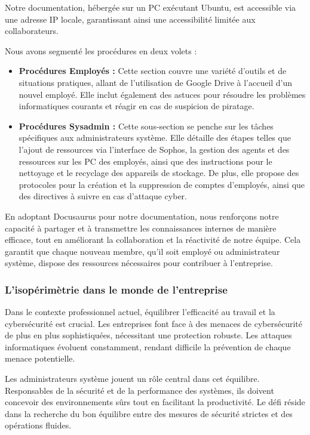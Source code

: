 Notre documentation, hébergée sur un PC  exécutant Ubuntu, est accessible via une adresse IP locale, garantissant ainsi une accessibilité limitée aux collaborateurs.

Nous avons segmenté les procédures en deux volets :
\begin{itemize}
    \item \textbf{Procédures Employés :} Cette section couvre une variété d'outils et de situations pratiques, allant de l'utilisation de Google Drive à l'accueil d'un nouvel employé.
    Elle inclut également des astuces pour résoudre les problèmes informatiques courants et réagir en cas de suspicion de piratage.
    \item \textbf{Procédures Sysadmin :} Cette sous-section se penche sur les tâches spécifiques aux administrateurs système.
    Elle détaille des étapes telles que l'ajout de ressources via l'interface de Sophos, la gestion des agents et des ressources sur les PC des employés, ainsi que des instructions pour le nettoyage et le recyclage des appareils de stockage.
    De plus, elle propose des protocoles pour la création et la suppression de comptes d'employés, ainsi que des directives à suivre en cas d'attaque cyber.
\end{itemize}

En adoptant Docusaurus pour notre documentation, nous renforçons notre capacité à partager et à transmettre les connaissances internes de manière efficace, tout en améliorant la collaboration et la réactivité de notre équipe.
Cela garantit que chaque nouveau membre, qu'il soit employé ou administrateur système, dispose des ressources nécessaires pour contribuer à l'entreprise. 


\subsubsection{L'isopérimètrie dans le monde de l'entreprise}
Dans le contexte professionnel actuel, équilibrer l'efficacité au travail et la cybersécurité est crucial.
Les entreprises font face à des menaces de cybersécurité de plus en plus sophistiquées, nécessitant une protection robuste.
Les attaques informatiques évoluent constamment, rendant difficile la prévention de chaque menace potentielle.

Les administrateurs système jouent un rôle central dans cet équilibre.
Responsables de la sécurité et de la performance des systèmes, ils doivent concevoir des environnements sûrs tout en facilitant la productivité.
Le défi réside dans la recherche du bon équilibre entre des mesures de sécurité strictes et des opérations fluides.

